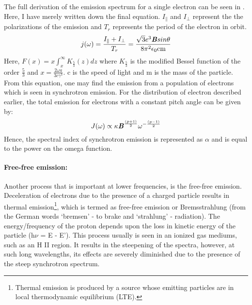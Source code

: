 \documentclass[../main/thesis_msc.tex]{subfiles}
\begin{document}
\noindent The full derivation of the emission spectrum for a single electron can be seen in \citet{longair}. Here, I have merely written down the final equation. $I_{\|}$ and $I_{\bot}$ represent the the polarizations of the emission and $T_r$ represents the period of the electron in orbit.
\begin{equation}
j(\omega) = \frac{I_{\|} + I_{\bot}}{T_r} = \frac{\sqrt{3} e^3 \textbf{\textit{B}} sin \theta }{8 \pi^2 \epsilon_0 \text{cm}}
\end{equation}
Here, $F(x) = x \int_x ^{ \infty } K_{\frac{5}{3}} (z) dz$ where $K_{\frac{5}{3}}$  is the modified Bessel function of the order $\frac{5}{3}$ and $x= \frac{2\omega a }{3c \gamma^3}.$ c is the speed of light and m is the mass of the particle.
From this equation, one may find the emission from a population of electrons which is seen in synchrotron emission. For the distribution of electron described earlier, the total emission for electrons with a constant pitch angle can be given by:
\begin{equation}
J(\omega) \propto \kappa \textbf{\textit{B}}^{\frac{(p+1)}{2}} \omega^{-\frac{(p-1)}{2}}
\end{equation}
Hence, the spectral index of synchrotron emission is represented as $\alpha$ and is equal to the power on the omega function.
\paragraph{Free-free emission:}
Another process that is important at lower frequencies, is the free-free emission. Deceleration of electrons due to the presence of a charged particle results in thermal emission\footnote{Thermal emission is produced by a source whose emitting particles are in local thermodynamic equilibrium (LTE).}, which is termed as free-free emission or Bremsstrahlung (from the German words `bremsen' - to brake and `strahlung'  - radiation). The energy/frequency of the proton depends upon the loss in kinetic energy of the particle (h$\nu$ = E - E'). This process usually is seen in an ionized gas mediums, such as an H II region. It results in the steepening of the spectra, however, at such long wavelengths, its effects are severely diminished due to the presence of the steep synchrotron spectrum.
\end{document}
